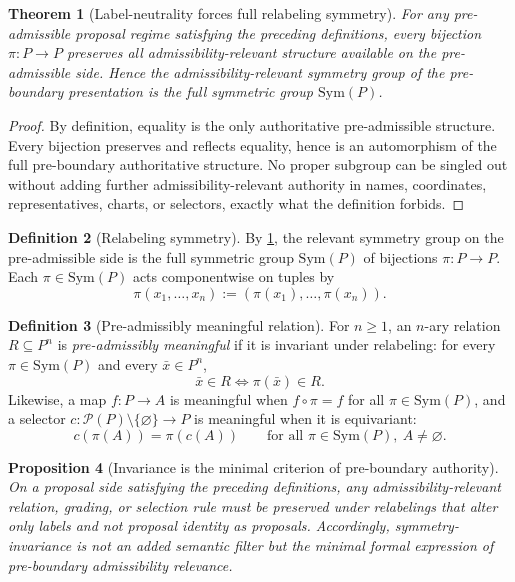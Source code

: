 \documentclass[11pt]{article}
\theoremstyle{plain}
\newtheorem{theorem}{Theorem}[section]
\newtheorem{proposition}[theorem]{Proposition}
\theoremstyle{definition}
\newtheorem{definition}[theorem]{Definition}
\begin{document}
\begin{theorem}[Label-neutrality forces full relabeling symmetry]
\label{thm:B-full-symmetry}
For any pre-admissible proposal regime satisfying the preceding definitions, every bijection $\pi:P\to P$ preserves all admissibility-relevant structure available on the pre-admissible side. Hence the admissibility-relevant symmetry group of the pre-boundary presentation is the full symmetric group $\mathrm{Sym}(P)$.
\end{theorem}

\begin{proof}
By definition, equality is the only authoritative pre-admissible structure. Every bijection preserves and reflects equality, hence is an automorphism of the full pre-boundary authoritative structure. No proper subgroup can be singled out without adding further admissibility-relevant authority in names, coordinates, representatives, charts, or selectors, exactly what the definition forbids.
\end{proof}

\begin{definition}[Relabeling symmetry]
By \cref{thm:B-full-symmetry}, the relevant symmetry group on the pre-admissible side is the full symmetric group $\mathrm{Sym}(P)$ of bijections $\pi:P\to P$. Each $\pi\in\mathrm{Sym}(P)$ acts componentwise on tuples by
\[
\pi(x_1,\dots,x_n):=(\pi(x_1),\dots,\pi(x_n)).
\]
\end{definition}

\begin{definition}[Pre-admissibly meaningful relation]
For $n\ge 1$, an $n$-ary relation $R\subseteq P^n$ is \emph{pre-admissibly meaningful} if it is invariant under relabeling: for every $\pi\in\mathrm{Sym}(P)$ and every $\bar x\in P^n$,
\[
\bar x\in R \Longleftrightarrow \pi(\bar x)\in R.
\]
Likewise, a map $f:P\to A$ is meaningful when $f\circ \pi=f$ for all $\pi\in\mathrm{Sym}(P)$, and a selector $c:\mathcal P(P)\setminus\{\varnothing\}\to P$ is meaningful when it is equivariant:
\[
c(\pi(A))=\pi(c(A)) \qquad \text{for all }\pi\in\mathrm{Sym}(P),\ A\neq\varnothing.
\]
\end{definition}

\begin{proposition}[Invariance is the minimal criterion of pre-boundary authority]
\label{prop:B-invariance-minimal}
On a proposal side satisfying the preceding definitions, any admissibility-relevant relation, grading, or selection rule must be preserved under relabelings that alter only labels and not proposal identity as proposals. Accordingly, symmetry-invariance is not an added semantic filter but the minimal formal expression of pre-boundary admissibility relevance.
\end{proposition}
\end{document}
